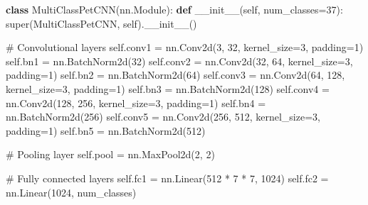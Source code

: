 \documentclass[
]{article}
\newenvironment{Shaded}{\begin{snugshade}}{\end{snugshade}}
\newcommand{\BuiltInTok}[1]{\textcolor[rgb]{0.00,0.23,0.31}{#1}}
\newcommand{\CommentTok}[1]{\textcolor[rgb]{0.37,0.37,0.37}{#1}}
\newcommand{\DecValTok}[1]{\textcolor[rgb]{0.68,0.00,0.00}{#1}}
\newcommand{\FunctionTok}[1]{\textcolor[rgb]{0.28,0.35,0.67}{#1}}
\newcommand{\KeywordTok}[1]{\textcolor[rgb]{0.00,0.23,0.31}{\textbf{#1}}}
\newcommand{\NormalTok}[1]{\textcolor[rgb]{0.00,0.23,0.31}{#1}}
\newcommand{\OperatorTok}[1]{\textcolor[rgb]{0.37,0.37,0.37}{#1}}
\newcommand{\VariableTok}[1]{\textcolor[rgb]{0.07,0.07,0.07}{#1}}
\begin{document}
\begin{Shaded}
\begin{Highlighting}[]
\KeywordTok{class}\NormalTok{ MultiClassPetCNN(nn.Module):}
    \KeywordTok{def} \FunctionTok{\_\_init\_\_}\NormalTok{(}\VariableTok{self}\NormalTok{, num\_classes}\OperatorTok{=}\DecValTok{37}\NormalTok{):}
        \BuiltInTok{super}\NormalTok{(MultiClassPetCNN, }\VariableTok{self}\NormalTok{).}\FunctionTok{\_\_init\_\_}\NormalTok{()}
        
        \CommentTok{\# Convolutional layers}
        \VariableTok{self}\NormalTok{.conv1 }\OperatorTok{=}\NormalTok{ nn.Conv2d(}\DecValTok{3}\NormalTok{, }\DecValTok{32}\NormalTok{, kernel\_size}\OperatorTok{=}\DecValTok{3}\NormalTok{, padding}\OperatorTok{=}\DecValTok{1}\NormalTok{)}
        \VariableTok{self}\NormalTok{.bn1 }\OperatorTok{=}\NormalTok{ nn.BatchNorm2d(}\DecValTok{32}\NormalTok{)}
        \VariableTok{self}\NormalTok{.conv2 }\OperatorTok{=}\NormalTok{ nn.Conv2d(}\DecValTok{32}\NormalTok{, }\DecValTok{64}\NormalTok{, kernel\_size}\OperatorTok{=}\DecValTok{3}\NormalTok{, padding}\OperatorTok{=}\DecValTok{1}\NormalTok{)}
        \VariableTok{self}\NormalTok{.bn2 }\OperatorTok{=}\NormalTok{ nn.BatchNorm2d(}\DecValTok{64}\NormalTok{)}
        \VariableTok{self}\NormalTok{.conv3 }\OperatorTok{=}\NormalTok{ nn.Conv2d(}\DecValTok{64}\NormalTok{, }\DecValTok{128}\NormalTok{, kernel\_size}\OperatorTok{=}\DecValTok{3}\NormalTok{, padding}\OperatorTok{=}\DecValTok{1}\NormalTok{)}
        \VariableTok{self}\NormalTok{.bn3 }\OperatorTok{=}\NormalTok{ nn.BatchNorm2d(}\DecValTok{128}\NormalTok{)}
        \VariableTok{self}\NormalTok{.conv4 }\OperatorTok{=}\NormalTok{ nn.Conv2d(}\DecValTok{128}\NormalTok{, }\DecValTok{256}\NormalTok{, kernel\_size}\OperatorTok{=}\DecValTok{3}\NormalTok{, padding}\OperatorTok{=}\DecValTok{1}\NormalTok{)}
        \VariableTok{self}\NormalTok{.bn4 }\OperatorTok{=}\NormalTok{ nn.BatchNorm2d(}\DecValTok{256}\NormalTok{)}
        \VariableTok{self}\NormalTok{.conv5 }\OperatorTok{=}\NormalTok{ nn.Conv2d(}\DecValTok{256}\NormalTok{, }\DecValTok{512}\NormalTok{, kernel\_size}\OperatorTok{=}\DecValTok{3}\NormalTok{, padding}\OperatorTok{=}\DecValTok{1}\NormalTok{)}
        \VariableTok{self}\NormalTok{.bn5 }\OperatorTok{=}\NormalTok{ nn.BatchNorm2d(}\DecValTok{512}\NormalTok{)}
        
        \CommentTok{\# Pooling layer}
        \VariableTok{self}\NormalTok{.pool }\OperatorTok{=}\NormalTok{ nn.MaxPool2d(}\DecValTok{2}\NormalTok{, }\DecValTok{2}\NormalTok{)}
        
        \CommentTok{\# Fully connected layers}
        \VariableTok{self}\NormalTok{.fc1 }\OperatorTok{=}\NormalTok{ nn.Linear(}\DecValTok{512} \OperatorTok{*} \DecValTok{7} \OperatorTok{*} \DecValTok{7}\NormalTok{, }\DecValTok{1024}\NormalTok{)}
        \VariableTok{self}\NormalTok{.fc2 }\OperatorTok{=}\NormalTok{ nn.Linear(}\DecValTok{1024}\NormalTok{, num\_classes)}
\end{Highlighting}
\end{Shaded}
\end{document}
